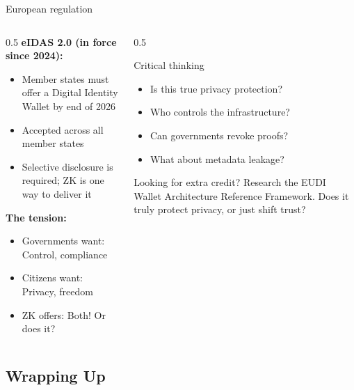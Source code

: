 \ifdefined\PRESENTATION\else\PassOptionsToClass{handout}{beamer}\fi\documentclass[aspectratio=169, lualatex]{beamer}
\begin{document}
\begin{frame}{European regulation}
	\begin{columns}[c]
		\begin{column}{0.5\textwidth}
			\textbf{eIDAS 2.0 (in force since 2024):}
			\begin{itemize}
				\item Member states must offer a Digital Identity Wallet by end of 2026
				\item Accepted across all member states
				\item Selective disclosure is required; ZK is one way to deliver it
			\end{itemize}
			\textbf{The tension:}
			\begin{itemize}
				\item Governments want: Control, compliance
				\item Citizens want: Privacy, freedom
				\item ZK offers: Both! Or does it?
			\end{itemize}
		\end{column}
		\begin{column}{0.5\textwidth}
			\begin{alertblock}{Critical thinking}
				\begin{itemize}
					\item Is this true privacy protection?
					\item Who controls the infrastructure?
					\item Can governments revoke proofs?
					\item What about metadata leakage?
				\end{itemize}
			\end{alertblock}
			\begin{exampleblock}{Looking for extra credit?}
				Research the EUDI Wallet Architecture Reference Framework. Does it truly protect privacy, or just shift trust?
			\end{exampleblock}
		\end{column}
	\end{columns}
\end{frame}

\subsection{Wrapping Up}
\end{document}
